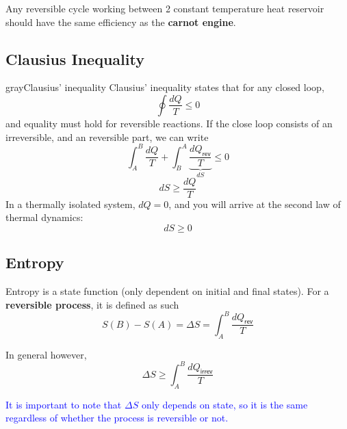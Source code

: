 Any reversible cycle working between 2 constant temperature heat reservoir should have the same efficiency as the \textbf{carnot engine}.

\subsection{Clausius Inequality}
\begin{mybox}{gray}{Clausius' inequality}
    Clausius' inequality states that for any closed loop,
    \begin{equation}
        \oint \frac{dQ}{T} \leq 0
    \end{equation}
    and equality must hold for reversible reactions.
    If the close loop consists of an irreversible, and an reversible part, we can write 
    \begin{equation}
        \int_A^B \frac{dQ}{T} + \int_B^A\underbrace{ \frac{dQ_{\textsf{rev}}}{T}}_{dS} \leq 0
    \end{equation}
    \begin{equation}
        dS\geq \frac{dQ}{T}
    \end{equation}
    In a thermally isolated system, $dQ=0$, and you will arrive at the second law of thermal dynamics: 
    \begin{equation}
        \boxed{dS\geq 0}
    \end{equation}
\end{mybox}

\subsection{Entropy}
Entropy is a state function (only dependent on initial and final states). For a \textbf{reversible process}, it is defined as such
\begin{equation}
    S(B)-S(A)=\Delta S= \int_A^B \frac{dQ_{\textsf{rev}}}{T}
\end{equation}

In general however,
\begin{equation}
    \Delta S \geq  \int_A^B \frac{dQ_{\textsf{irrev}}}{T}
\end{equation}

\textcolor{blue}{It is important to note that $\Delta S$ only depends on state, so it is the same regardless of whether the process is reversible or not.}

